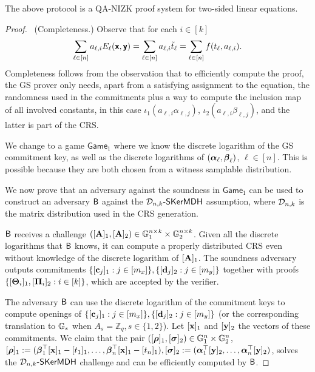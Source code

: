 \begin{theorem}
The above protocol is a QA-NIZK proof system for two-sided linear equations.
\end{theorem}  
\begin{proof}\ 
(Completeness.)  Observe that for each $i\in[k]$
\begin{equation}
\sum_{\ell\in[n]} a_{\ell,i} E_{\ell}(\textbf{\textsf{x}},\textbf{\textsf{y}})= \sum_{\ell\in[n]} a_{\ell,i}\tilde{t}_\ell=\sum_{\ell\in[n]}f(t_\ell,a_{\ell,i}).
\end{equation}  Completeness follows 
from the observation that to efficiently compute the proof, the GS prover only needs, apart from a satisfying assignment to the equation, the randomness used in the commitments plus a way to compute the inclusion map of all involved constants, in this case $\iota_1(a_{\ell,i} \alpha_{\ell,j})$,
$\iota_2(a_{\ell,i} \beta_{\ell,j})$, and the latter is part of the CRS.
 
 We change to a game $\mathsf{Game}_{1}$ where we know the discrete logarithm of the GS commitment key, as well as the discrete logarithms of $({\boldsymbol \alpha}_{\ell},{\boldsymbol \beta}_{\ell})$, $\ell \in [n]$. This is possible because they are both chosen from a witness samplable distribution.

We now prove that an adversary against the soundness in $\mathsf{Game}_{1}$ can be used to construct an adversary $\mathsf{B}$ against the 
$\mathcal{D}_{n,k}\mbox{-}\mathsf{SKerMDH}$ assumption, where 
$\mathcal{D}_{n,k}$ is the matrix distribution used in the CRS generation. 

$\mathsf{B}$ receives a challenge $([\mathbf{{A}}]_1,[\mathbf{{A}}]_2)\in\mathbb{G}_1^{n\times k}\times\mathbb{G}_2^{n\times k}$. Given all the discrete logarithms that $\mathsf{B}$ knows, it can compute a properly distributed CRS even without knowledge of the discrete logarithm of $[\mathbf{{A}}]_1$. The  soundness adversary outputs commitments $\{[\mathbf{c}_j]_1:j\in[m_x]\},\{[\mathbf{d}_{j}]_2:j\in[m_y]\}$ together with proofs $\{[\mathbf{{\Theta}}_{i}]_1,[\mathbf{{\Pi}}_{i}]_2:i \in [k]\}$, which are accepted by the verifier.

The adversary $\mathsf{B}$ can use the discrete logarithm of the commitment keys to compute openings of $\{[\mathbf{c}_j]_1:j\in[m_x]\},\{[\mathbf{d}_j]_2:j\in[m_y]\}$ (or the corresponding translation to $\mathbb{G}_s$ when $A_s=\mathbb{Z}_q, s\in\{1,2\}$). Let $[\mathbf{x}]_1$ and $[\mathbf{y}]_2$ the vectors of these commitments.
We claim that the pair  $([{\boldsymbol \rho}]_1,[{\boldsymbol \sigma}]_2) \in \mathbb{G}_1^{n} \times \mathbb{G}_2^n$, 
$[{\boldsymbol \rho}]_1:=({\boldsymbol \beta}_1^\top[\mathbf{x}]_1 -[t_1]_1,\ldots,
{\boldsymbol \beta}_{n}^\top[\mathbf{x}]_1 -[t_{n}]_1),  
[{\boldsymbol \sigma}]_2:=({\boldsymbol \alpha}_1^\top[\mathbf{y}]_2,\ldots,
{\boldsymbol \alpha}_{n}^\top[\mathbf{y}]_2)$, solves the  $\mathcal{D}_{n,k}\mbox{-}\mathsf{SKerMDH}$ challenge and can be efficiently computed by $\mathsf{B}$. 


\end{proof}
